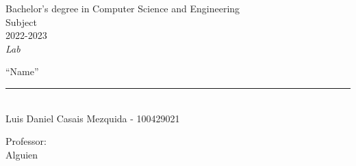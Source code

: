 \begin{titlepage}
	\begin{sffamily}
	\color{azulUC3M}
	\begin{center}
		\begin{figure}[H] %
		\end{figure}
		\vspace{1.5cm}
		\begin{Large}
			Bachelor's degree in Computer Science and Engineering\\
            Subject\\
			2022-2023\\
			\vspace{2cm}		
			\textsl{Lab}
			\bigskip
			
		\end{Large}
		 	{\Huge ``Name''}\\
		 	\vspace*{0.5cm}
	 		\rule{10.5cm}{0.1mm}\\
			\vspace*{0.9cm}
			{\LARGE Luis Daniel Casais Mezquida - 100429021}\\
			
			\vspace*{1cm}
		\begin{Large}
		    Professor:\\
			Alguien\\
		\end{Large}
	\end{center}
	\vfill

	\end{sffamily}
\end{titlepage}